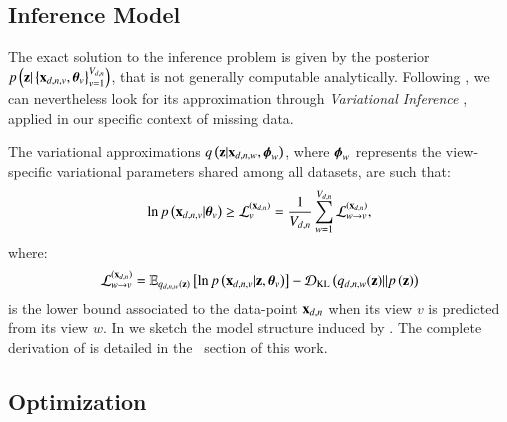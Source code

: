 \subsection{Inference Model}
\label{ssec:derivation}

The exact solution to the inference problem is given by the posterior $p\left(\mathbf{z}|\left\{\mathbf{x}_{d,n,v},\boldsymbol{\theta}_v\right\}_{v=1}^{V_{d,n}}\right)$, that is not generally computable analytically.
Following \cite{Antelmi2019}, we can nevertheless look for its approximation through \textit{Variational Inference} \citep{Blei2017}, applied in our specific context of missing data.

The variational approximations $q\left(\mathbf{z}|\mathbf{x}_{d,n,w}, \boldsymbol{\phi}_w\right)$, where $\boldsymbol{\phi}_w$ represents the view-specific variational parameters shared among all datasets, are such that:
%
\begin{equation}\label{eq:newLB}
	\begin{aligned}
		\ln p\left(\mathbf{x}_{d,n,v}|\boldsymbol{\theta}_v\right) \geq \mathcal{L}_v^{(\mathbf{x}_{d,n})} = \frac{1}{V_{d,n}} \sum_{w=1}^{V_{d,n}} \mathcal{L}_{w \rightarrow v}^{(\mathbf{x}_{d,n})},
	\end{aligned}
\end{equation}
%
where:
%
\begin{equation}\label{eq:LBdnvw}
	\begin{aligned}
		\mathcal{L}_{w \rightarrow v}^{(\mathbf{x}_{d,n})} = \operatorname{\mathbb{E}}_{q_{d,n,w}(\mathbf{z})}\left[\ln p\left(\mathbf{x}_{d,n,v}|\mathbf{z}, \boldsymbol{\theta}_v\right)\right] - \operatorname{\mathcal{D}_{KL}}\left(q_{d,n,w}(\mathbf{z})||p\left(\mathbf{z}\right)\right)
	\end{aligned}
\end{equation}
%
is the lower bound associated to the data-point $\mathbf{x}_{d,n}$ when its view $v$ is predicted from its view $w$.
%
In  we sketch the model structure induced by .
The complete derivation of  is detailed in the \supmat\ section of this work.



\subsection{Optimization}
\label{ssec:optimization}

